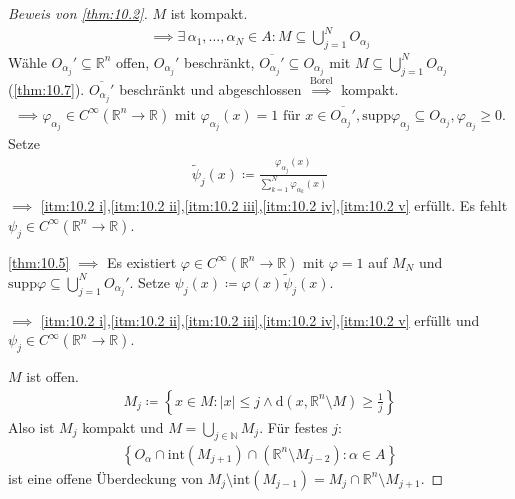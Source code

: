 \documentclass[a4paper,10pt]{scrbook}
\begin{document}
\begin{proof}[Beweis von \ref{thm:10.2}]
   $M$ ist kompakt.
  \begin{align*}
    \implies \exists \, \alpha_1,\ldots,\alpha_N \in A : M \subseteq \bigcup\limits_{j=1}^{N} O_{\alpha_j}
  \end{align*}
  Wähle $O_{\alpha_j}' \subseteq \mathbb{R}^n$ offen, $O_{\alpha_j}'$ beschränkt, $\overline{O_{\alpha_j}'} \subseteq O_{\alpha_j}$ mit $M \subseteq \bigcup\limits_{j=1}^{N} O_{\alpha_j}$ (\ref{thm:10.7}). $\overline{O_{\alpha_j}'}$ beschränkt und abgeschlossen $\overset{\text{Borel}}{\implies}$ kompakt.
  \begin{multline*}
    \implies \varphi_{\alpha_j} \in C^\infty(\mathbb{R}^n \to \mathbb{R}) \text{ mit } \varphi_{\alpha_j}(x) = 1 \text{ für } x \in \overline{O_{\alpha_j}'}, \mathrm{supp} \varphi_{\alpha_j} \subseteq O_{\alpha_j}, \varphi_{\alpha_j} \geq 0.
  \end{multline*}
  Setze
  \begin{align*}
    \widetilde{\psi}_j(x) \coloneq \frac{\varphi_{\alpha_j}(x)}{\sum\limits_{k=1}^{N} \varphi_{\alpha_k}(x)}
  \end{align*}
  $\implies$ \ref{itm:10.2 i},\ref{itm:10.2 ii},\ref{itm:10.2 iii},\ref{itm:10.2 iv},\ref{itm:10.2 v} erfüllt. Es fehlt $\psi_j \in C^\infty(\mathbb{R}^n \to \mathbb{R})$.

  \ref{thm:10.5} $\implies$ Es existiert $\varphi \in C^\infty(\mathbb{R}^n \to \mathbb{R})$ mit $\varphi = 1$ auf $M_N$ und $\mathrm{supp}\varphi \subseteq \bigcup\limits_{j=1}^{N} O_{\alpha_j}'$. Setze $\psi_j(x) \coloneq \varphi(x) \widetilde{\psi}_j(x)$.

  $\implies$ \ref{itm:10.2 i},\ref{itm:10.2 ii},\ref{itm:10.2 iii},\ref{itm:10.2 iv},\ref{itm:10.2 v} erfüllt und $\psi_j \in C^\infty(\mathbb{R}^n \to \mathbb{R})$.


   $M$ ist offen.
  \begin{align*}
    M_j \coloneq \left\{ x \in M : |x| \leq j \land \mathrm{d}(x,\mathbb{R}^n \setminus M) \geq \frac{1}{j} \right\}
  \end{align*}
  Also ist $M_j$ kompakt und $M = \bigcup\limits_{j \in \mathbb{N}} M_j$. Für festes $j$:
  \begin{align*}
    \left\{ O_\alpha \cap \mathrm{int}(M_{j+1}) \cap (\mathbb{R}^n \setminus M_{j-2}) : \alpha \in A \right\}
  \end{align*}
  ist eine offene Überdeckung von $M_j \setminus \mathrm{int}(M_{j-1}) = M_j \cap \mathbb{R}^n \setminus M_{j+1}$.


\end{proof}
\end{document}
